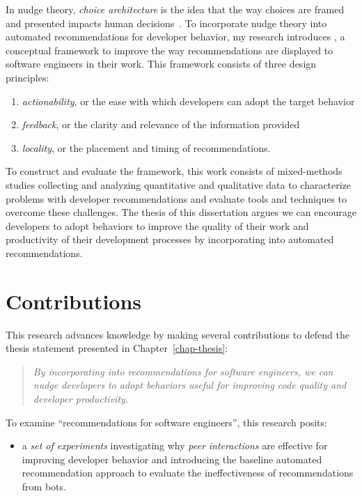  In nudge theory, \textit{choice architecture} is the idea that the way choices are framed and presented impacts human decisions~\cite{thaler2013choice}. To incorporate nudge theory into automated recommendations for developer behavior, my research introduces \FRAMEWORK, a conceptual framework to improve the way recommendations are displayed to software engineers in their work. This framework consists of three design principles:
\begin{enumerate}[topsep=0pt,itemsep=-1ex,partopsep=1ex,parsep=1ex]
    \item \textit{actionability}, or the ease with which developers can adopt the target behavior
    \item \textit{feedback}, or the clarity and relevance of the information provided
    \item \textit{locality}, or the placement and timing of recommendations.
\end{enumerate}

To construct and evaluate the framework, this work consists of mixed-methods studies collecting and analyzing quantitative and qualitative data to characterize problems with developer recommendations and evaluate tools and techniques to overcome these challenges. The thesis of this dissertation argues we can encourage developers to adopt behaviors to improve the quality of their work and productivity of their development processes by incorporating \framework into automated recommendations.


\section{Contributions}

This research advances knowledge by making several contributions to defend the thesis statement presented in Chapter~\ref{chap-thesis}:

\begin{quote}
\textsl{By incorporating \framework into recommendations for software engineers, we can nudge developers to adopt behaviors useful for improving code quality and developer productivity.}   
\end{quote}

To examine ``recommendations for software engineers'', this research posits: 

\begin{itemize}
    \item a \textit{set of experiments} investigating why \textit{peer interactions} are effective for improving developer behavior and introducing the \tele baseline automated recommendation approach to evaluate the ineffectiveness of recommendations from bots.
\end{itemize} 

